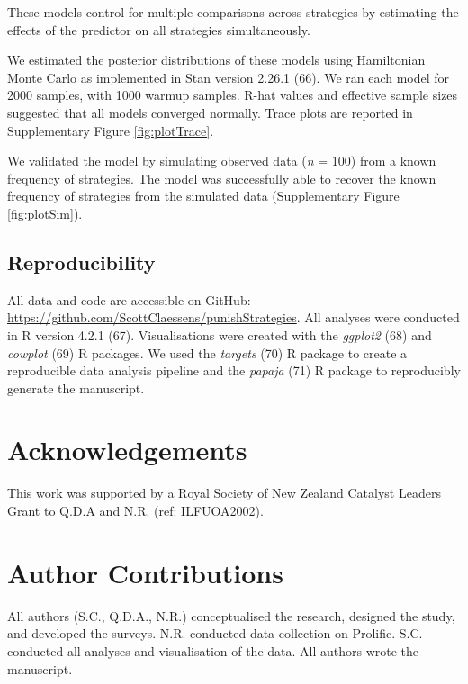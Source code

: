 \documentclass[
  english,
  man, donotrepeattitle,floatsintext]{apa6}
\begin{document}
These models control for multiple comparisons across strategies by estimating
the effects of the predictor on all strategies simultaneously.

We estimated the posterior distributions of these models using Hamiltonian Monte
Carlo as implemented in Stan version 2.26.1 (66). We ran each model for
2000 samples, with 1000 warmup samples. R-hat values and effective sample sizes
suggested that all models converged normally. Trace plots are reported in
Supplementary Figure \ref{fig:plotTrace}.

We validated the model by simulating observed data (\emph{n} = 100) from a known
frequency of strategies. The model was successfully able to recover the known
frequency of strategies from the simulated data (Supplementary Figure
\ref{fig:plotSim}).

\hypertarget{reproducibility}{%
\subsection{Reproducibility}\label{reproducibility}}

All data and code are accessible on GitHub:
\url{https://github.com/ScottClaessens/punishStrategies}. All analyses were conducted
in R version 4.2.1 (67). Visualisations were created with the \emph{ggplot2}
(68) and \emph{cowplot} (69) R packages. We used the \emph{targets}
(70) R package to create a reproducible data analysis pipeline and the
\emph{papaja} (71) R package to reproducibly generate the manuscript.

\newpage
\nolinenumbers

\hypertarget{acknowledgements}{%
\section{Acknowledgements}\label{acknowledgements}}

This work was supported by a Royal Society of New Zealand Catalyst Leaders Grant
to Q.D.A and N.R. (ref: ILFUOA2002).

\hypertarget{author-contributions}{%
\section{Author Contributions}\label{author-contributions}}

All authors (S.C., Q.D.A., N.R.) conceptualised the research, designed the
study, and developed the surveys. N.R. conducted data collection on Prolific.
S.C. conducted all analyses and visualisation of the data. All authors wrote the
manuscript.
\end{document}
